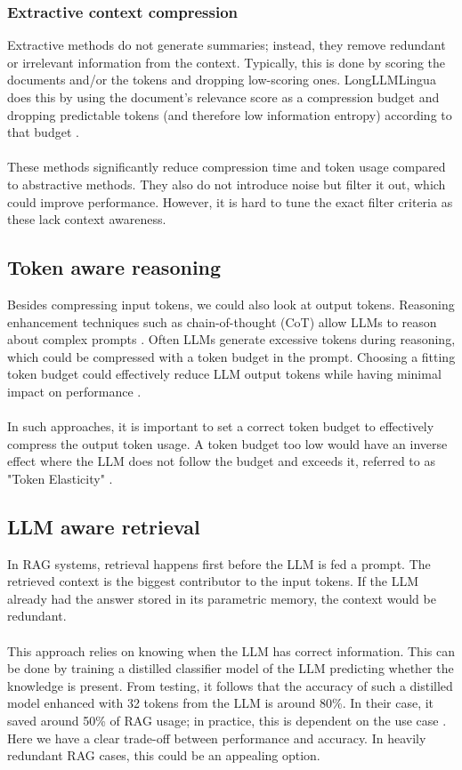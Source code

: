 \documentclass[pdflatex,sn-mathphys-num,oneside]{sn-jnl}%
\theoremstyle{thmstyleone}%
\theoremstyle{thmstyletwo}%
\theoremstyle{thmstylethree}%
\begin{document}
\subsubsection{Extractive context compression}
Extractive methods do not generate summaries; instead, they remove redundant or irrelevant information from the context. 
Typically, this is done by scoring the documents and/or the tokens and dropping low-scoring ones. 
LongLLMLingua does this by using the document's relevance score as a compression budget and dropping predictable tokens (and therefore low information entropy) according to that budget \cite{longlingua}.
\\ \\
These methods significantly reduce compression time and token usage compared to abstractive methods. They also do not introduce noise but filter it out, which could improve performance.
However, it is hard to tune the exact filter criteria as these lack context awareness. 

\subsection{Token aware reasoning}
Besides compressing input tokens, we could also look at output tokens. 
Reasoning enhancement techniques such as chain-of-thought (CoT) allow LLMs to reason about complex prompts \cite{cot}. 
Often LLMs generate excessive tokens during reasoning, which could be compressed with a token budget in the prompt. 
Choosing a fitting token budget could effectively reduce LLM output tokens while having minimal impact on performance \cite{rbudget}. 
\\ \\
In such approaches, it is important to set a correct token budget to effectively compress the output token usage. 
A token budget too low would have an inverse effect where the LLM does not follow the budget and exceeds it, referred to as "Token Elasticity" \cite{rbudget}.

\subsection{LLM aware retrieval}
In RAG systems, retrieval happens first before the LLM is fed a prompt. The retrieved context is the biggest contributor to the input tokens.
If the LLM already had the answer stored in its parametric memory, the context would be redundant.
\\ \\
This approach relies on knowing when the LLM has correct information. 
This can be done by training a distilled classifier model of the LLM predicting whether the knowledge is present.
From testing, it follows that the accuracy of such a distilled model enhanced with 32 tokens from the LLM is around 80\%.
In their case, it saved around 50\% of RAG usage; in practice, this is dependent on the use case \cite{LLMretrieval}. 
Here we have a clear trade-off between performance and accuracy. In heavily redundant RAG cases, this could be an appealing option.
\end{document}
